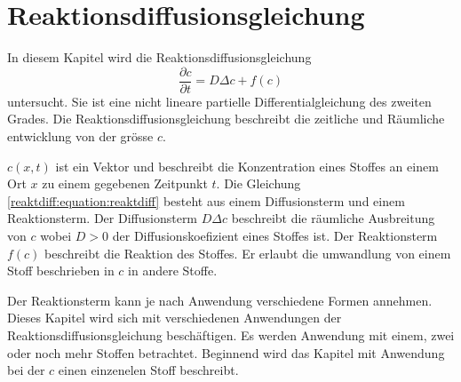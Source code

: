%
%
%
%
\chapter{Reaktionsdiffusionsgleichung\label{chapter:reaktdiff}}
\begin{refsection}

In diesem Kapitel wird die Reaktionsdiffusionsgleichung
\begin{equation}
\label{reaktdiff:equation:reaktdiff}
\frac{\partial c}{\partial t} = D \Delta c + f(c)
\end{equation}
untersucht.
Sie ist eine nicht lineare partielle Differentialgleichung des zweiten Grades.
Die Reaktionsdiffusionsgleichung beschreibt die zeitliche und Räumliche entwicklung von der grösse \(c\).

\(c(x,t)\) ist ein Vektor und beschreibt die Konzentration eines Stoffes an einem Ort \(x\) zu einem gegebenen Zeitpunkt \(t\).
Die Gleichung \ref{reaktdiff:equation:reaktdiff} besteht aus einem Diffusionsterm und einem Reaktionsterm.
Der Diffusionsterm \(D \Delta c\) beschreibt die räumliche Ausbreitung von \(c\) wobei \(D > 0\) der Diffusionskoefizient eines Stoffes ist.
Der Reaktionsterm \(f(c)\) beschreibt die Reaktion des Stoffes.
Er erlaubt die umwandlung von einem Stoff beschrieben in \(c\) in andere Stoffe.

Der Reaktionsterm kann je nach Anwendung verschiedene Formen annehmen.
Dieses Kapitel wird sich mit verschiedenen Anwendungen der Reaktionsdiffusionsgleichung beschäftigen.
Es werden Anwendung mit einem, zwei oder noch mehr Stoffen betrachtet.
Beginnend wird das Kapitel mit Anwendung bei der \(c\) einen einzenelen Stoff beschreibt.







\printbibliography[heading=subbibliography]
\end{refsection}
